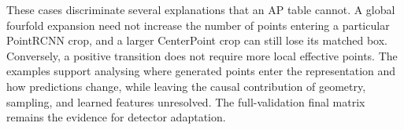 \FloatBarrier

These cases discriminate several explanations that an AP table cannot.
A global fourfold expansion need not increase the number of points
entering a particular PointRCNN crop, and a larger CenterPoint crop
can still lose its matched box. Conversely, a positive transition does
not require more local effective points. The examples support analysing
where generated points enter the representation and how predictions
change, while leaving the causal contribution of geometry, sampling,
and learned features unresolved. The full-validation final matrix
remains the evidence for detector adaptation.
